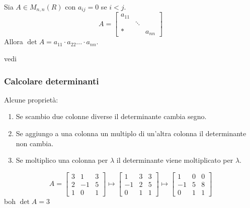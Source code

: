 \begin{proprieta}
    Sia $A\in M_{n,n}(R)$ con $a_{ij}=0$ se $i<j$.
    \begin{equation}
        A = \begin{bmatrix}
            a_{11} \\
              & \ddots & \\
            * &   & a_{nn}
        \end{bmatrix}
    \end{equation}
    Allora $\det A=a_{11}\cdot a_{22}...\cdot a_{nn}$.
    \begin{dimostrazione}
        vedi
    \end{dimostrazione}
\end{proprieta}

\subsubsection{Calcolare determinanti}
Alcune proprietà:
\begin{enumerate}
    \item Se scambio due colonne diverse il determinante cambia segno.
    \item Se aggiungo a una colonna un multiplo di un'altra colonna il determinante non cambia.
    \item Se moltiplico una colonna per $\lambda$ il determinante viene moltiplicato per $\lambda$.
\end{enumerate}
\begin{esempio}
    \begin{equation}
        A =\begin{bmatrix}
            3 & 1 & 3 \\
            2 &-1 & 5 \\
            1 & 0 & 1
            \end{bmatrix} \mapsto \begin{bmatrix}
            1 & 3 & 3 \\
            -1& 2 & 5\\
            0 & 1 & 1
            \end{bmatrix} \mapsto \begin{bmatrix}
            1 & 0 & 0\\
            -1& 5 & 8 \\
            0 & 1 & 1
        \end{bmatrix}
    \end{equation}
    boh $\det A = 3$
\end{esempio}





